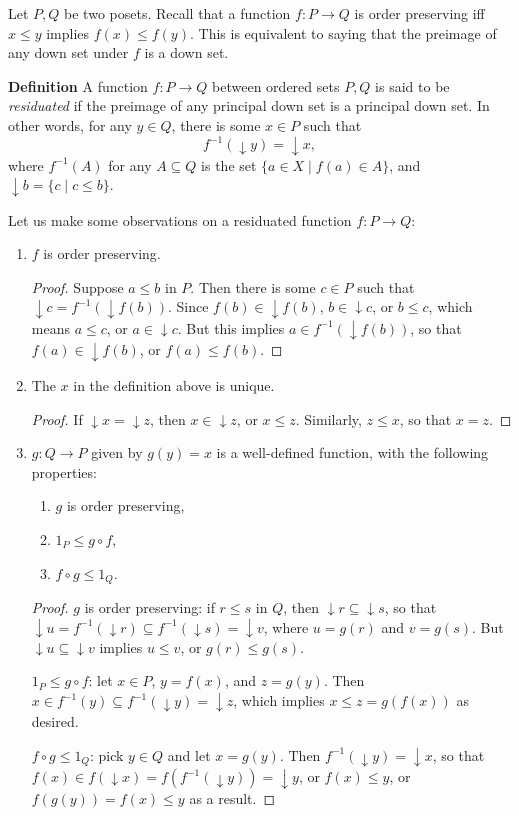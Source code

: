 \documentclass[12pt]{article}
\newcommand{\down}{\downarrow\!\!}
\begin{document}
Let $P,Q$ be two posets.  Recall that a function $f:P\to Q$ is order preserving iff $x\le y$ implies $f(x)\le f(y)$.  This is equivalent to saying that the preimage of any down set under $f$ is a down set.

\textbf{Definition}  A function $f:P\to Q$ between ordered sets $P,Q$ is said to be \emph{residuated} if the preimage of any principal down set is a principal down set.  In other words, for any $y\in Q$, there is some $x\in P$ such that $$f^{-1}(\down{y}) = \down{x},$$ where $f^{-1}(A)$ for any $A\subseteq Q$ is the set $\lbrace a\in X\mid f(a)\in A\rbrace$, and $\down b = \lbrace c \mid c\le b\rbrace$.

Let us make some observations on a residuated function $f:P\to Q$:
\begin{enumerate}
\item $f$ is order preserving.
\begin{proof}
Suppose $a\le b$ in $P$.  Then there is some $c\in P$ such that $\down c = f^{-1}(\down f(b))$.  Since $f(b) \in \down f(b)$, $b \in \down c$, or $b\le c$, which means $a\le c$, or $a\in \down c$.  But this implies $a\in f^{-1}(\down f(b))$, so that $f(a) \in \down f(b)$, or $f(a)\le f(b)$.
\end{proof}
\item The $x$ in the definition above is unique.
\begin{proof}  If $\down x = \down z$, then $x\in \down z$, or $x\le z$.  Similarly, $z\le x$, so that $x=z$.
\end{proof}
\item $g:Q\to P$ given by $g(y)=x$ is a well-defined function, with the following properties:
\begin{enumerate}
\item $g$ is order preserving,
\item $1_P \le g\circ f$,
\item $f\circ g\le 1_Q$.
\end{enumerate}
\begin{proof}
$g$ is order preserving: if $r\le s$ in $Q$, then $\down r \subseteq \down s$, so that $\down u = f^{-1}(\down r)\subseteq f^{-1}(\down s) = \down v$, where $u=g(r)$ and $v=g(s)$.  But $\down u\subseteq \down v$ implies $u\le v$, or $g(r)\le g(s)$.

$1_P \le g\circ f$: let $x\in P$, $y=f(x)$, and $z=g(y)$.  Then $x\in f^{-1}(y) \subseteq f^{-1}(\down y) = \down z$, which implies $x\le z=g(f(x))$ as desired.

$f\circ g\le 1_Q$: pick $y\in Q$ and let $x=g(y)$.  Then $f^{-1}(\down y)=\down x$, so that $f(x)\in f(\down x) = f(f^{-1}( \down y))=\down y$, or $f(x)\le y$, or $f(g(y))=f(x) \le y$ as a result.
\end{proof}
\end{enumerate}
\end{document}
